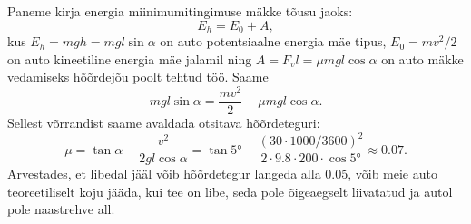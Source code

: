 Paneme kirja energia miinimumitingimuse mäkke tõusu jaoks:
\[
E_h = E_0 + A,
\]
kus $E_h = mgh = mgl\sin \alpha$ on auto potentsiaalne energia mäe tipus, $E_0 = mv^2/2$ on auto kineetiline energia mäe jalamil ning $A = F_vl = \mu mgl \cos \alpha$ on auto mäkke vedamiseks hõõrdejõu poolt tehtud töö. Saame
\[
m g l \sin \alpha=\frac{m v^{2}}{2}+\mu m g l \cos \alpha.
\]
Sellest võrrandist saame avaldada otsitava hõõrdeteguri:
\[
\mu=\tan \alpha-\frac{v^{2}}{2 g l \cos \alpha}=\tan \ang{5}-\frac{(\num{30} \cdot \num{1000} / \num{3600})^{2}}{\num{2} \cdot \num{9,8} \cdot \num{200} \cdot \cos \ang{5}} \approx \num{0,07}.
\]
Arvestades, et libedal jääl võib hõõrdetegur langeda alla \num{0,05}, võib meie auto teoreetiliselt koju jääda, kui tee on libe, seda pole õigeaegselt liivatatud ja autol pole naastrehve all.
\probend
